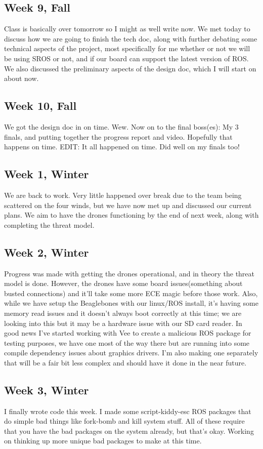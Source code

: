 \documentclass[IEEEtran,letterpaper,10pt,notitlepage,draftclsnofoot,onecolumn]{article}
\begin{document}
\subsection{Week 9, Fall}
Class is basically over tomorrow so I might as well write now. We met 
today to discuss how we are going to finish the tech doc, along with 
further debating some technical aspects of the project, most specifically 
for me whether or not we will be using SROS or not, and if our board can 
support the latest version of ROS. We also discussed the preliminary aspects 
of the design doc, which I will start on about now.
\subsection{Week 10, Fall}
We got the design doc in on time. Wew. Now on to the final boss(es): My 3 
finals, and putting together the progress report and video. Hopefully that 
happens on time. EDIT: It all happened on time. Did well on my finals too!
\subsection{Week 1, Winter}
We are back to work. Very little happened over break due to the team being 
scattered on the four winds, but we have now met up and discussed our current 
plans. We aim to have the drones functioning by the end of next week, along 
with completing the threat model. 
\subsection{Week 2, Winter}
Progress was made with getting the drones operational, and in theory the threat 
model is done. However, the drones have some board issues(something about 
busted connections) and it'll take some more ECE magic before those work. 
Also, while we have setup the Beaglebones with our linux/ROS install, it's 
having some memory read issues and it doesn't always boot correctly at this 
time; we are looking into this but it may be a hardware issue with our SD card 
reader. In good news I've started working with Vee to create a malicious ROS 
package for testing purposes, we have one most of the way there but are running
into some compile dependency issues about graphics drivers. I'm also making one 
separately that will be a fair bit less complex and should have it done in the 
near future.
\subsection{Week 3, Winter}
I finally wrote code this week. I made some script-kiddy-esc ROS packages that 
do simple bad things like fork-bomb and kill system stuff. All of these require 
that you have the bad packages on the system already, but that's okay. Working 
on thinking up more unique bad packages to make at this time.
\end{document}
